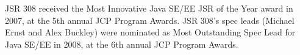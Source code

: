 \documentclass[10pt]{article}
\begin{document}
JSR 308 received
the Most Innovative Java SE/EE JSR of the Year award in 2007,
at the 5th annual JCP Program Awards.
JSR 308's spec leads (Michael
Ernst and Alex Buckley) were nominated as Most Outstanding Spec Lead for
Java SE/EE in 2008, at the 6th annual JCP Program Awards.





\end{document}
